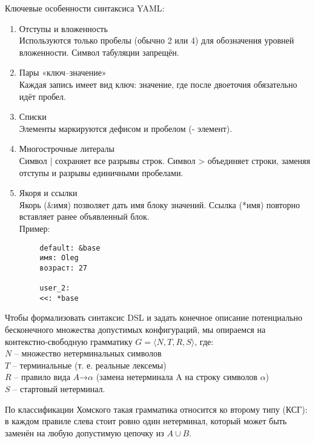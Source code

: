 Ключевые особенности синтаксиса YAML:
\begin{enumerate}[1.]
    \item Отступы и вложенность\\
          Используются только пробелы (обычно 2 или 4) для обозначения уровней вложенности. Символ табуляции запрещён.
    \item Пары «ключ–значение»\\
          Каждая запись имеет вид ключ: значение, где после двоеточия обязательно идёт пробел.
    \item Списки\\
          Элементы маркируются дефисом и пробелом (- элемент).
    \item Многострочные литералы\\
          Символ | сохраняет все разрывы строк. Символ > объединяет строки, заменяя отступы и разрывы единичными пробелами.
    \item Якоря и ссылки\\
          Якорь (\&имя) позволяет дать имя блоку значений. Ссылка (*имя) повторно вставляет ранее объявленный блок.\\
          Пример:
\end{enumerate}

\begin{verbatim}
        default: &base
        имя: Oleg
        возраст: 27

        user_2:
        <<: *base
\end{verbatim}
Чтобы формализовать синтаксис DSL и задать конечное описание потенциально
бесконечного множества допустимых конфигураций,
мы опираемся на контекстно-свободную грамматику $G=\langle N,T,R,S\rangle$, где:\\
$N$ – множество нетерминальных символов \\
$T$ – терминальные (т. е. реальные лексемы) \\
$R$ – правило вида $A$→$\alpha$ (замена нетерминала A на строку символов $\alpha$) \\
$S$ – стартовый нетерминал.

По классификации Хомского такая грамматика относится ко второму типу (КСГ): в каждом правиле слева стоит ровно один нетерминал, который может быть заменён на любую допустимую цепочку из  $A\cup B$.

